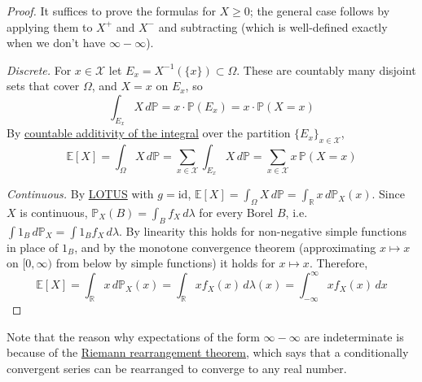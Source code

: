   \begin{proof}
    It suffices to prove the formulas for $X \geq 0$; the general case follows by applying them to $X^+$ and $X^-$ and subtracting (which is well-defined exactly when we don't have $\infty - \infty$). 

    \textit{Discrete.} For $x \in \mathcal{X}$ let $E_x = X^{-1} (\{x\}) \subset \Omega$. These are countably many disjoint sets that cover $\Omega$, and $X = x$ on $E_x$, so 
    \begin{equation}
      \int_{E_x} X \, d\mathbb{P} = x \cdot \mathbb{P}(E_x) = x \cdot \mathbb{P}(X = x)
    \end{equation}
    By \hyperref[mt-thm:countable-additivity-of-integration]{countable additivity of the integral} over the partition $\{E_x\}_{x \in \mathcal{X}}$, 
    \begin{equation}
      \mathbb{E}[X] = \int_\Omega X \, d\mathbb{P} = \sum_{x \in \mathcal{X}} \int_{E_x} X \, d\mathbb{P} = \sum_{x \in \mathcal{X}} x \, \mathbb{P}(X = x)
    \end{equation}

    \textit{Continuous.} By \hyperref[thm:lotus]{LOTUS} with $g = \mathrm{id}$, $\mathbb{E}[X] = \int_\Omega X \,d\mathbb{P} = \int_{\mathbb{R}} x \,d\mathbb{P}_X (x)$. Since $X$ is continuous, $\mathbb{P}_X (B) = \int_B f_X \,d\lambda$ for every Borel $B$, i.e. $\int 1_B \,d\mathbb{P}_X = \int 1_B f_X \,d\lambda$. By linearity this holds for non-negative simple functions in place of $1_B$, and by the monotone convergence theorem (approximating $x \mapsto x$ on $[0, \infty)$ from below by simple functions) it holds for $x \mapsto x$. Therefore, 
    \begin{equation}
      \mathbb{E}[X] = \int_{\mathbb{R}} x \,d\mathbb{P}_X (x) = \int_{\mathbb{R}} x f_X (x) \,d\lambda (x) = \int_{-\infty}^\infty x f_X (x) \,dx
    \end{equation}
  \end{proof}

  Note that the reason why expectations of the form $\infty - \infty$ are indeterminate is because of the \hyperref[real-thm:riemann-rearrangement-theorem]{Riemann rearrangement theorem}, which says that a conditionally convergent series can be rearranged to converge to any real number. 

